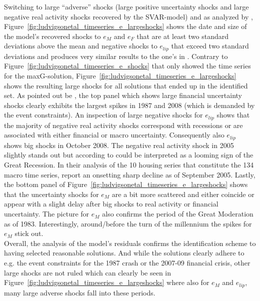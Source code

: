 \documentclass[a4paper,11pt,listof=nochaptergap,oneside,pointednumbers,bibtotoc,bigheadings,liststotoc,hidelinks]{scrbook}
\theoremstyle{mysatz}
\theoremstyle{mydefinition}
\theoremstyle{mytheorem}
\theoremstyle{mybemerkung}
\begin{document}
Switching to large ``adverse'' shocks (large positive uncertainty shocks and large negative real activity shocks recovered by the SVAR-model) and as analyzed by \citet{ludvigsonetal:19}, Figure~\ref{fig:ludvigsonetal_timeseries_e_largeshocks} shows the date and size of the model's recovered shocks to $e_M$ and $e_F$ that are at least two standard deviations above the mean and negative shocks to $e_{lip}$ that exceed two standard deviations and produces very similar results to the one's in \citet{ludvigsonetal:19}. Contrary to Figure~\ref{fig:ludvigsonetal_timeseries_e_shocks} that only showed the time series for the maxG-solution, Figure~\ref{fig:ludvigsonetal_timeseries_e_largeshocks} shows the resulting large shocks for all solutions that ended up in the identified set. As pointed out be \citet{ludvigsonetal:19}, the top panel which shows large financial uncertainty shocks clearly exhibits the largest spikes in 1987 and 2008 (which is demanded by the event constraints). An inspection of large negative shocks for $e_{lip}$ shows that the majority of negative real activity shocks correspond with recessions or are associated with either financial or macro uncertainty. Consequently also $e_{lip}$ shows big shocks in October 2008. The negative real activity shock in 2005 slightly stands out but according to \citet{ludvigsonetal:19} could be interpreted as a looming sign of the Great Recession. In their analysis of the 10 housing series that constitute the 134 macro time series, \citet{ludvigsonetal:19} report an onsetting sharp decline as of September 2005. Lastly, the bottom panel of Figure~\ref{fig:ludvigsonetal_timeseries_e_largeshocks} shows that the uncertainty shocks for $e_M$ are a bit more scattered and either coincide or appear with a slight delay after big shocks to real activity or financial uncertainty. The picture for $e_M$ also confirms the period of the Great Moderation as of 1983. Interestingly, around/before the turn of the millennium the spikes for $e_M$ stick out.\\

Overall, the analysis of the model's residuals confirms the identification scheme to having selected reasonable solutions. And while the solutions clearly adhere to e.g. the event constraints for the 1987 crash or the 2007-09 financial crisis, other large shocks are not ruled which can clearly be seen in Figure~\ref{fig:ludvigsonetal_timeseries_e_largeshocks} where also for $e_M$ and $e_{lip}$, many large adverse shocks fall into these periods.
\end{document}
